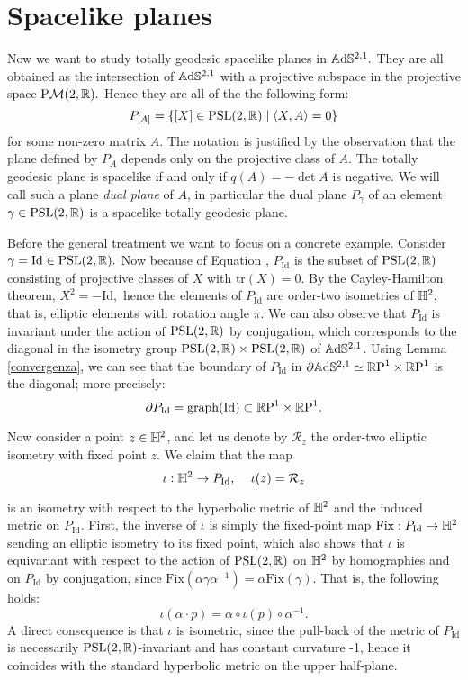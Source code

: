 \section{Spacelike planes}
Now we want to study totally geodesic spacelike planes in $\mathbb{A}\mathrm{d}\mathbb{S}^{2,1}.$ They are all obtained as the intersection of $\mathbb{A}\mathrm{d}\mathbb{S}^{2,1}$ with a projective subspace in the projective space $\text{P}\mathcal{M}(2,\mathbb{R}).$ Hence they are all of the the following form: 
\begin{equation}\label{geoplanes}
    P_{[A]}=\{[X]\in\text{PSL}(2,\mathbb{R})\;|\;\langle X,A\rangle=0\}
\end{equation}
for some non-zero matrix $A$. The notation is justified by the observation that the plane defined by $P_A$ depends only on the projective class of $A$. The totally geodesic plane is spacelike if and only if $q(A)=-\det A$ is negative. We will call such a plane \textit{dual plane} of $A$, in particular the dual plane $P_\gamma$  of an element $\gamma\in\text{PSL}(2,\mathbb{R})$ is a spacelike totally geodesic plane. \\
\begin{example}\label{spacelikeisometry}
Before the general treatment we want to focus on a concrete example. Consider $\gamma=\text{Id}\in\text{PSL}(2,\mathbb{R}).$ Now because of Equation , $P_{\text{Id}}$ is the subset of $\text{PSL}(2,\mathbb{R})$ consisting of projective classes of $X$ with $\text{tr}(X)=0$. By the Cayley-Hamilton theorem, $X^2=-\text{Id},$ hence the elements of $P_{\text{Id}}$ are order-two isometries of $\mathbb{H}^2,$ that is, elliptic elements with rotation angle $\pi$.  We can also observe that $P_{\text{Id}}$ is invariant under the action of $\text{PSL}(2,\mathbb{R})$ by conjugation, which corresponds to the diagonal in the isometry group $\text{PSL}(2,\mathbb{R})\times\text{PSL}(2,\mathbb{R})$ of $\mathbb{A}\mathrm{d}\mathbb{S}^{2,1}$. Using Lemma \ref{convergenza}, we can see that the boundary of $P_{\text{Id}}$ in $\partial\mathbb{A}\mathrm{d}\mathbb{S}^{2,1}\simeq \mathbb{R}\text{P}^1\times\mathbb{R}\text{P}^1$ is the diagonal; more precisely: 
\begin{equation}\label{graphino}
    \partial P_{\text{Id}}=\text{graph(Id)}\subset \mathbb{R}\text{P}^1\times\mathbb{R}\text{P}^1.
\end{equation}

Now consider a point $z\in\mathbb{H}^2$, and let us denote by $\mathcal{R}_z$ the order-two elliptic isometry with fixed point $z$. We claim that the map 
\[
    \iota:\mathbb{H}^2\to P_{\text{Id}},\;\;\;\ \iota(z)=\mathcal{R}_z
\]

is an isometry with respect to the hyperbolic metric of $\mathbb{H}^2$ and the induced metric on $P_{\text{Id}}.$ First, the inverse of $\iota$ is simply the fixed-point map $\text{Fix}:P_{\text{Id}}\to\mathbb{H}^2$ sending an elliptic isometry to its fixed point, which also shows that $\iota$ is equivariant with respect to the action of $\text{PSL}(2,\mathbb{R})$ on $\mathbb{H}^2$ by homographies and on $P_\text{Id}$ by conjugation, since $\text{Fix}(\alpha\gamma\alpha^{-1})=\alpha\text{Fix}(\gamma).$ That is, the following holds: 
\begin{equation}
    \iota(\alpha\cdot p)=\alpha\circ\iota(p)\circ\alpha^{-1}.
\end{equation} 
A direct consequence is that $\iota$ is isometric, since the pull-back of the metric of $P_\text{Id}$ is necessarily $\text{PSL}(2,\mathbb{R})$-invariant and has constant curvature -1, hence it coincides with the standard hyperbolic metric on the upper half-plane.
\end{example}
